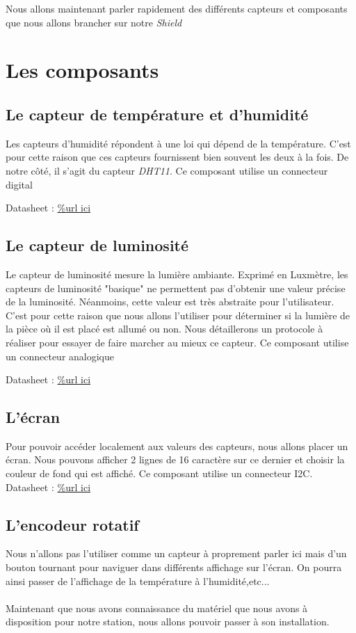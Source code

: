 Nous allons maintenant parler rapidement des différents capteurs et composants que nous allons brancher sur notre \textit{Shield}

\section{Les composants}

\subsection{Le capteur de température et d'humidité}

Les capteurs d'humidité répondent à une loi qui dépend de la température. C'est pour cette raison que ces capteurs fournissent bien souvent les deux à la fois. De notre côté, il s'agit du capteur \textit{DHT11}. Ce composant utilise un connecteur digital

Datasheet : \url{%url ici}

\subsection{Le capteur de luminosité}

Le capteur de luminosité mesure la lumière ambiante. Exprimé en Luxmètre, les capteurs de luminosité "basique" ne permettent pas d'obtenir une valeur précise de la luminosité. Néanmoins, cette valeur est très abstraite pour l'utilisateur. C'est pour cette raison que nous allons l'utiliser pour déterminer si la lumière de la pièce où il est placé est allumé ou non. Nous détaillerons un protocole à réaliser pour essayer de faire marcher au mieux ce capteur. Ce composant utilise un connecteur analogique

Datasheet : \url{ %url ici}

\subsection{L'écran}

Pour pouvoir accéder localement aux valeurs des capteurs, nous allons placer un écran.
Nous pouvons afficher 2 lignes de 16 caractère sur ce dernier et choisir la couleur de fond qui est affiché. Ce composant utilise un connecteur I2C.
Datasheet : \url{%url ici}

\subsection{L'encodeur rotatif}

Nous n'allons pas l'utiliser comme un capteur à proprement parler ici mais d'un bouton tournant pour naviguer dans différents affichage sur l'écran. On pourra ainsi passer de l'affichage de la température à l'humidité,etc...\\
\\

Maintenant que nous avons connaissance du matériel que nous avons à disposition pour notre station, nous allons pouvoir passer à son installation.





